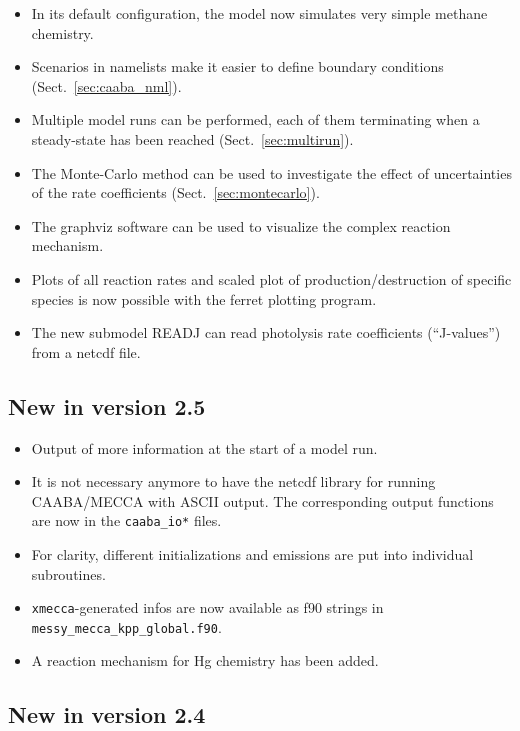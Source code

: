 \documentclass[twoside]{article}
\def\nosep{\setlength\parsep{0mm}\setlength\topsep{0mm}\setlength\itemsep{0mm}}
\begin{document}
\begin{itemize}\nosep
\item In its default configuration, the model now simulates very simple
  methane chemistry.
\item Scenarios in namelists make it easier to define boundary
  conditions (Sect.~\ref{sec:caaba_nml}).
\item Multiple model runs can be performed, each of them terminating
  when a steady-state has been reached (Sect.~\ref{sec:multirun}).
\item The Monte-Carlo method can be used to investigate the effect of
  uncertainties of the rate coefficients (Sect.~\ref{sec:montecarlo}).
\item The graphviz software can be used to visualize the complex
  reaction mechanism.
\item Plots of all reaction rates and scaled plot of
  production/destruction of specific species is now possible with the
  ferret plotting program.
\item The new submodel READJ can read photolysis rate coefficients
  (``J-values'') from a netcdf file.
\end{itemize}

\subsection{New in version 2.5}

\begin{itemize}\nosep
\item Output of more information at the start of a model run.
\item It is not necessary anymore to have the netcdf library for running
  CAABA/MECCA with ASCII output. The corresponding output functions are
  now in the \verb|caaba_io*| files.
\item For clarity, different initializations and emissions are put into
  individual subroutines.
\item \verb|xmecca|-generated infos are now available as f90 strings in
  \verb|messy_mecca_kpp_global.f90|.
\item A reaction mechanism for Hg chemistry has been added.
\end{itemize}

\subsection{New in version 2.4}
\end{document}

